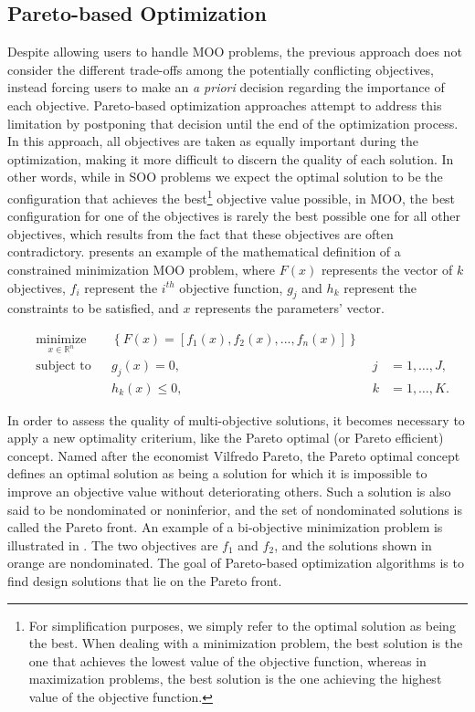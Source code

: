 	\subsection{Pareto-based Optimization}
	\label{ssec:pareto}
	
	Despite allowing users to handle \ac{MOO} problems, the previous approach does not consider the different trade-offs among the potentially conflicting objectives, instead forcing users to make an \textit{a priori} decision regarding the importance of each objective. Pareto-based optimization approaches attempt to address this limitation by postponing that decision until the end of the optimization process. In this approach, all objectives are taken as equally important during the optimization, making it more difficult to discern the quality of each solution. In other words, while in \ac{SOO} problems we expect the optimal solution to be the configuration that achieves the best\footnote{For simplification purposes, we simply refer to the optimal solution as being the best. When dealing with a minimization problem, the best solution is the one that achieves the lowest value of the objective function, whereas in maximization problems, the best solution is the one achieving the highest value of the objective function.} objective value possible, in \ac{MOO}, the best configuration for one of the objectives is rarely the best possible one for all other objectives, which results from the fact that these objectives are often contradictory.  presents an example of the mathematical definition of a constrained minimization \ac{MOO} problem, where $F(x)$ represents the vector of $k$ objectives, $f_i$ represent the $i^{th}$ objective function, $g_j$ and $h_k$ represent the constraints to be satisfied, and $x$ represents the parameters' vector.
	
	\begin{equation} \label{eq:pareto-based}
	\begin{aligned}
	& \underset{x \in \mathbb{R}^n}{\text{minimize}}
	& & \left\lbrace F(x) = \left[f_1(x), f_2(x), ..., f_n(x)\right]  \right\rbrace \\
	& \text{subject to}
	& & g_j(x) = 0, & \; j &= 1, \ldots, J, \\ 
	&&& h_k(x) \leq 0, & \; k &= 1, \ldots, K.
	\end{aligned}
	\end{equation}
	
	In order to assess the quality of multi-objective solutions, it becomes necessary to apply a new optimality criterium, like the Pareto optimal (or Pareto efficient) concept. Named after the economist Vilfredo Pareto, the Pareto optimal concept defines an optimal solution as being a solution for which it is impossible to improve an objective value without deteriorating others. Such a solution is also said to be nondominated or noninferior, and the set of nondominated solutions is called the Pareto front. An example of a bi-objective minimization problem is illustrated in . The two objectives are $f_1$ and $f_2$, and the solutions shown in orange are nondominated. The goal of Pareto-based optimization algorithms is to find design solutions that lie on the Pareto front.
	
